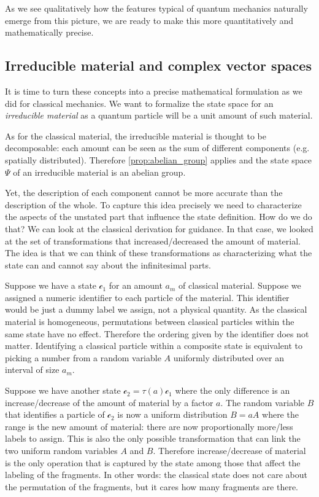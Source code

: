 \documentclass[smallextended]{svjour3}
\numberwithin{equation}{section}
\theoremstyle{definition}
\begin{document}
As we see qualitatively how the features typical of quantum mechanics naturally emerge from this picture, we are ready to make this more quantitatively and mathematically precise.

\subsection{Irreducible material and complex vector spaces}

It is time to turn these concepts into a precise mathematical formulation as we did for classical mechanics. We want to formalize the state space for an \emph{irreducible material} as a quantum particle will be a unit amount of such material.

As for the classical material, the irreducible material is thought to be decomposable: each amount can be seen as the sum of different components (e.g. spatially distributed). Therefore \ref{prop:abelian_group} applies and the state space $\Psi$ of an irreducible material is an abelian group.

Yet, the description of each component cannot be more accurate than the description of the whole. To capture this idea precisely we need to characterize the aspects of the unstated part that influence the state definition. How do we do that? We can look at the classical derivation for guidance. In that case, we looked at the set of transformations that increased/decreased the amount of material. The idea is that we can think of these transformations as characterizing what the state can and cannot say about the infinitesimal parts.

Suppose we have a state $\mathcal{c}_1$ for an amount $a_m$ of classical material. Suppose we assigned a numeric identifier to each particle of the material. This identifier would be just a dummy label we assign, not a physical quantity. As the classical material is homogeneous, permutations between classical particles within the same state have no effect. Therefore the ordering given by the identifier does not matter. Identifying a classical particle within a composite state is equivalent to picking a number from a random variable $A$ uniformly distributed over an interval of size $a_m$.

Suppose we have another state $\mathcal{c}_2 = \tau(a) \mathcal{c}_1$ where the only difference is an increase/decrease of the amount of material by a factor $a$. The random variable $B$ that identifies a particle of $\mathcal{c}_2$ is now a uniform distribution $B=aA$ where the range is the new amount of material: there are now proportionally more/less labels to assign. This is also the only possible transformation that can link the two uniform random variables $A$ and $B$. Therefore increase/decrease of material is the only operation that is captured by the state among those that affect the labeling of the fragments. In other words: the classical state does not care about the permutation of the fragments, but it cares how many fragments are there.
\end{document}
